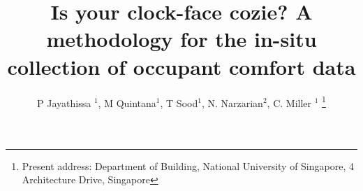 \documentclass[a4paper]{jpconf} %
\begin{document}



\title{Is your clock-face cozie? A methodology for the in-situ collection of occupant comfort data} 

\author{P Jayathissa $^1$, M Quintana$^1$,
T Sood$^1$, N. Narzarian$^2$, C. Miller $^1$ \footnote[4]{Present address:
Department of Building, National University of Singapore, 4 Architecture Drive, Singapore}}
\address{$^1$ Building and Urban Data Science Group,  Department of Building, Singapore}
\address{$^2$ University of New South Wales, Australia}











\end{document}

